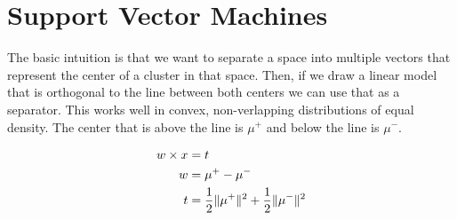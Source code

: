 \section{Support Vector Machines}

The basic intuition is that we want to separate a space
into multiple vectors that represent the center of a cluster
in that space. Then, if we draw a linear model that is orthogonal
to the line between both centers we can use that as a separator.
This works well in convex, non-verlapping distributions of equal
density. The center that is above the line is $\mu^+$ and below
the line is $\mu^-$.

\begin{definition}
  \begin{align*}
    w \times x &= t \\
    w &= \mu^+ - \mu^- \\
    t &= \frac{1}{2} \lVert\mu^+\rVert^2 + \frac{1}{2} \lVert\mu^-\rVert^2
  \end{align*}
\end{definition}
